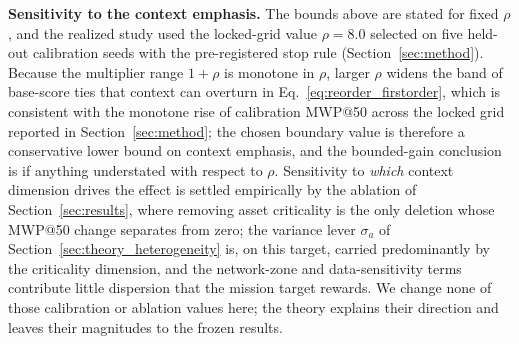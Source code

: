 \textbf{Sensitivity to the context emphasis.} The bounds above are stated for
fixed $\rho$, and the realized study used the locked-grid value $\rho{=}8.0$
selected on five held-out calibration seeds with the pre-registered stop rule
(Section~\ref{sec:method}). Because the multiplier range $1+\rho$ is monotone in
$\rho$, larger $\rho$ widens the band of base-score ties that context can overturn
in Eq.~\ref{eq:reorder_firstorder}, which is consistent with the monotone rise of
calibration MWP@50 across the locked grid reported in Section~\ref{sec:method};
the chosen boundary value is therefore a conservative lower bound on context
emphasis, and the bounded-gain conclusion is if anything understated with respect
to $\rho$. Sensitivity to \emph{which} context dimension drives the effect is
settled empirically by the ablation of Section~\ref{sec:results}, where removing
asset criticality is the only deletion whose MWP@50 change separates from zero;
the variance lever $\sigma_a$ of Section~\ref{sec:theory_heterogeneity} is, on this
target, carried predominantly by the criticality dimension, and the network-zone
and data-sensitivity terms contribute little dispersion that the mission target
rewards. We change none of those calibration or ablation values here; the theory
explains their direction and leaves their magnitudes to the frozen results.
